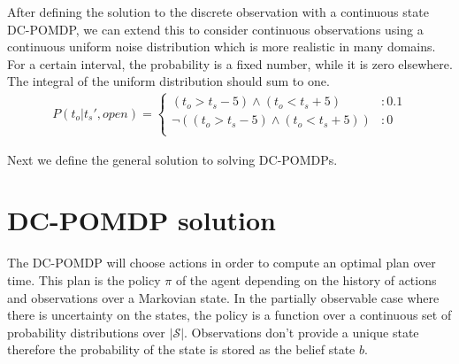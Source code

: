 \documentclass{article} %
\begin{document}
After defining the solution to the discrete observation with a continuous state DC-POMDP, we can extend this to consider continuous observations using a continuous uniform noise distribution which is more realistic in many domains. For a certain interval, the probability is a fixed number, while it is zero elsewhere. The integral of the uniform distribution should sum to one. 
\begin{align}
P(t_o|t_s',open) = 
\begin{cases}
 (t_o>t_s-5) \wedge (t_o<t_s+5) &: 0.1 \\
 \neg((t_o>t_s-5) \wedge (t_o<t_s+5)) &: 0 \\
\end{cases}\nonumber
\end{align}

Next we define the general solution to solving DC-POMDPs. 

\section{DC-POMDP solution}
The DC-POMDP will choose actions in order to compute an optimal plan over time. This plan is the policy $\pi$ of the agent  depending on the history of actions and observations over a Markovian state. In the partially observable case where there is uncertainty on the states, the policy is a function over a continuous set of probability distributions over $|\mathcal{S}|$. Observations don't provide a unique state therefore the probability of the state is stored as the belief state $b$.
\end{document}
